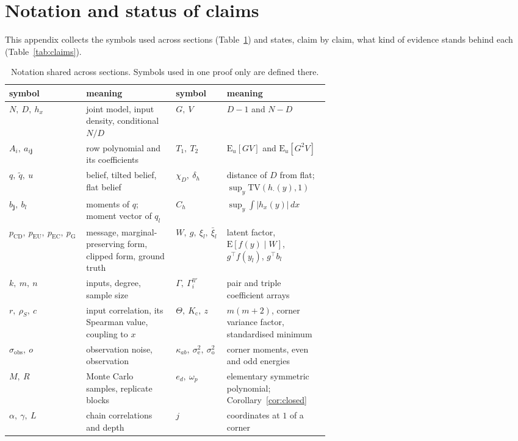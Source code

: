 \documentclass[10pt,a4paper]{article}
\newcommand{\pcd}{p_{\mathrm{CD}}}
\newcommand{\peu}{p_{\mathrm{EU}}}
\newcommand{\pec}{p_{\mathrm{EC}}}
\newcommand{\pg}{p_{\mathrm{G}}}
\newcommand{\rs}{\rho_S}
\newcommand{\Eu}{\mathrm{E}_u}
\newcommand{\TV}{\mathrm{TV}}
\newcommand{\sobs}{\sigma_{\mathrm{obs}}}
\newcommand{\se}{\sigma_{\mathrm{e}}}
\newcommand{\so}{\sigma_{\mathrm{o}}}
\theoremstyle{upright}
\begin{document}



\appendix
\section{Notation and status of claims}\label{app:claims}

This appendix collects the symbols used across sections (Table~\ref{tab:notation}) and states, claim by claim, what kind of evidence stands behind each (Table~\ref{tab:claims}).

\begin{table}[htbp]
\centering\footnotesize
\caption{Notation shared across sections. Symbols used in one proof only are defined there.}
\label{tab:notation}
\begin{tabular}{@{}l>{\raggedright\arraybackslash}p{0.29\linewidth}l>{\raggedright\arraybackslash}p{0.32\linewidth}@{}}
\toprule
symbol & meaning & symbol & meaning \\
\midrule
$N,\ D,\ h_x$ & joint model, input density, conditional $N/D$ & $G,\ V$ & $D-1$ and $N-D$ \\
$A_i,\ a_{i\mathbf{j}}$ & row polynomial and its coefficients & $T_1,\ T_2$ & $\Eu[GV]$ and $\Eu[G^2V]$ \\
$q,\ \tilde q,\ u$ & belief, tilted belief, flat belief & $\chi_D,\ \delta_h$ & distance of $D$ from flat; $\sup_y\TV(h_\cdot(y),1)$ \\
$b_{\mathbf{j}},\ b_l$ & moments of $q$; moment vector of $q_l$ & $C_h$ & $\sup_y\int|h_x(y)|\,dx$ \\
$\pcd,\ \peu,\ \pec,\ \pg$ & message, marginal-preserving form, clipped form, ground truth & $W,\ g,\ \xi_l,\ \bar\xi_l$ & latent factor, $\mathrm{E}[f(y)\mid W]$, $g^\top f(y_l)$, $g^\top b_l$ \\
$k,\ m,\ n$ & inputs, degree, sample size & $\Gamma,\ \Gamma^{ll'}_i$ & pair and triple coefficient arrays \\
$r,\ \rs,\ c$ & input correlation, its Spearman value, coupling to $x$ & $\Theta,\ K_{\mathrm c},\ z$ & $m(m+2)$, corner variance factor, standardised minimum \\
$\sobs,\ o$ & observation noise, observation & $\kappa_{ab},\ \se^2,\ \so^2$ & corner moments, even and odd energies \\
$M,\ R$ & Monte Carlo samples, replicate blocks & $e_d,\ \omega_p$ & elementary symmetric polynomial; Corollary~\ref{cor:closed} \\
$\alpha,\ \gamma,\ L$ & chain correlations and depth & $j$ & coordinates at $1$ of a corner \\

\end{tabular}
\end{table}
\end{document}
